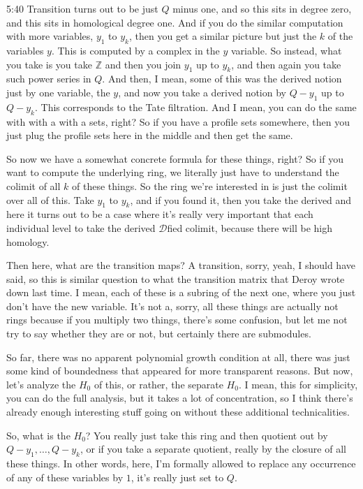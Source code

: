 \begin{unfinished}{5:40}
Transition turns out to be just $Q$ minus one, and so this sits in degree zero, and this sits in homological degree one. And if you do the similar computation with more variables, $y_1$ to $y_k$, then you get a similar picture but just the $k$ of the variables $y$. This is computed by a complex in the $y$ variable. So instead, what you take is you take $\mathbb{Z}$ and then you join $y_1$ up to $y_k$, and then again you take such power series in $Q$. And then, I mean, some of this was the derived notion just by one variable, the $y$, and now you take a derived notion by $Q - y_1$ up to $Q - y_k$. This corresponds to the Tate filtration. And I mean, you can do the same with with a with a sets, right? So if you have a profile sets somewhere, then you just plug the profile sets here in the middle and then get the same.

So now we have a somewhat concrete formula for these things, right? So if you want to compute the underlying ring, we literally just have to understand the colimit of all $k$ of these things. So the ring we're interested in is just the colimit over all of this. Take $y_1$ to $y_k$, and if you found it, then you take the derived and here it turns out to be a case where it's really very important that each individual level to take the derived $\mathcal{D}$fied colimit, because there will be high homology.

Then here, what are the transition maps? A transition, sorry, yeah, I should have said, so this is similar question to what the transition matrix that Deroy wrote down last time. I mean, each of these is a subring of the next one, where you just don't have the new variable. It's not a, sorry, all these things are actually not rings because if you multiply two things, there's some confusion, but let me not try to say whether they are or not, but certainly there are submodules.

So far, there was no apparent polynomial growth condition at all, there was just some kind of boundedness that appeared for more transparent reasons. But now, let's analyze the $H_0$ of this, or rather, the separate $H_0$. I mean, this for simplicity, you can do the full analysis, but it takes a lot of concentration, so I think there's already enough interesting stuff going on without these additional technicalities.

So, what is the $H_0$? You really just take this ring and then quotient out by $Q - y_1, \dots, Q - y_k$, or if you take a separate quotient, really by the closure of all these things. In other words, here, I'm formally allowed to replace any occurrence of any of these variables by $1$, it's really just set to $Q$.


\end{unfinished}
